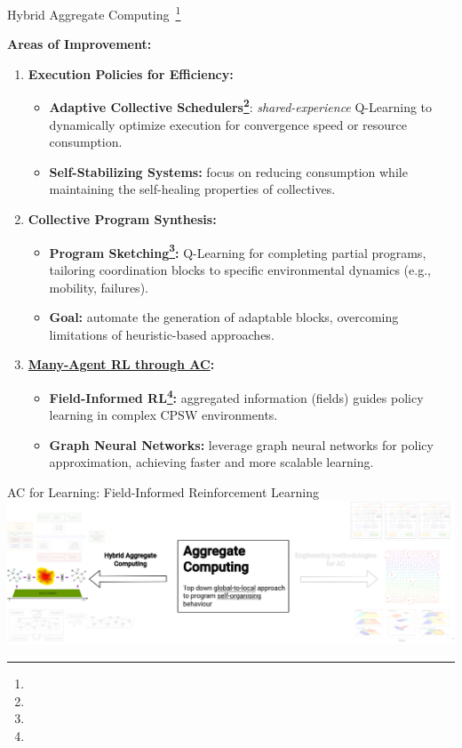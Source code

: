 \documentclass[presentation, 8pt,169]{beamer}\mode<presentation>{\usetheme{AMSBolognaFC}}
\begin{document}
\begin{frame}{Hybrid Aggregate Computing~\footnote[frame]{}}

  \textbf{Areas of Improvement:}
  
  \begin{enumerate}
  \item \textbf{Execution Policies for Efficiency:}
      \begin{itemize}
      \item \textbf{Adaptive Collective Schedulers\footnote{}}: \emph{shared-experience} Q-Learning to dynamically optimize execution for convergence speed or resource consumption.
      \item \textbf{Self-Stabilizing Systems:} focus on reducing consumption while maintaining the self-healing properties of collectives.
      \end{itemize}
  \item \textbf{Collective Program Synthesis:}
      \begin{itemize}
      \item \textbf{Program Sketching\footnote{}:} Q-Learning for completing partial programs, tailoring coordination blocks to specific environmental dynamics (e.g., mobility, failures).
      \item \textbf{Goal:} automate the generation of adaptable blocks, overcoming limitations of heuristic-based approaches.
      \end{itemize}
  \item \textbf{\underline{Many-Agent RL through AC}:}
      \begin{itemize}
      \item \textbf{Field-Informed RL\footnote{}:} aggregated information (fields) guides policy learning in complex CPSW environments.
      \item \textbf{Graph Neural Networks:} leverage graph neural networks for policy approximation, achieving faster and more scalable learning.
      \end{itemize}
  \end{enumerate}
  
\end{frame}
\begin{frame}{AC for Learning: Field-Informed Reinforcement Learning}
\includegraphics[width=\textwidth]{img/contribution-focus.drawio.png}
\end{frame}
\end{document}
